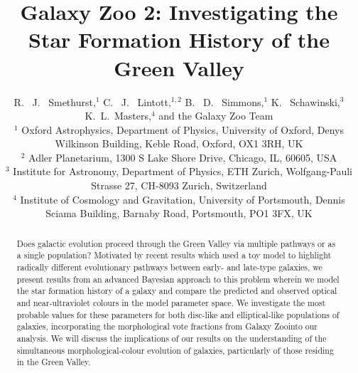 \documentclass{mn2e}
\begin{document}
\title[The Star Fomation History of the Green Valley]{Galaxy Zoo 2: Investigating the Star Formation History of the Green Valley}
\author[Smethurst et al. 2014]{R. ~J. ~Smethurst,$^1$ C. ~J. ~Lintott,$^{1,2}$ B. ~D. ~Simmons,$^{1}$ K. ~Schawinski,$^{3}$ \newauthor K.~L.~Masters,$^{4}$ and the Galaxy Zoo Team
\\ $^1$ Oxford Astrophysics, Department of Physics, University of Oxford, Denys Wilkinson Building, Keble Road, Oxford, OX1 3RH, UK 
\\ $^2$ Adler Planetarium, 1300 S Lake Shore Drive, Chicago, IL, 60605, USA 
\\ $^3$ Institute for Astronomy, Department of Physics, ETH Zurich, Wolfgang-Pauli Strasse 27, CH-8093 Zurich, Switzerland 
\\ $^4$ Institute of Cosmology and Gravitation, University of Portsmouth, Dennis Sciama Building, Barnaby Road, Portsmouth, PO1 3FX, UK }

\maketitle

\begin{abstract}
Does galactic evolution proceed through the Green Valley via multiple pathways or as a single population? Motivated by recent results which used a toy model to highlight radically different evolutionary pathways between early- and late-type galaxies, we present results from an advanced Bayesian approach to this problem wherein we model the star formation history of a galaxy and compare the predicted and observed optical and near-ultraviolet colours in the model parameter space. We investigate the most probable values for these parameters for both disc-like and elliptical-like populations of galaxies, incorporating the morphological vote fractions from Galaxy Zoo\footnotemark[1] into our analysis. We will discuss the implications of our results on the understanding of the simultaneous morphological-colour evolution of galaxies, particularly of those residing in the Green Valley. 
\end{abstract}

\\
\end{document}
